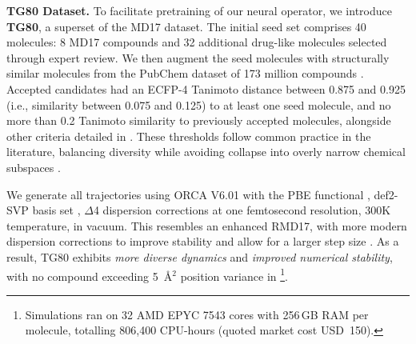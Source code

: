 \textbf{TG80 Dataset.}
To facilitate pretraining of our neural operator, we introduce \textbf{TG80}, a superset of the MD17 dataset. The initial seed set comprises 40 molecules: 8 MD17 compounds and 32 additional drug-like molecules selected through expert review. We then augment the seed molecules with structurally similar molecules from the PubChem dataset of 173 million compounds \cite{bolton_pubchem3d_2011}. 
%
Accepted candidates had an ECFP-4 Tanimoto distance between 0.875 and 0.925 (i.e., similarity between 0.075 and 0.125) to at least one seed molecule, and no more than 0.2 Tanimoto similarity to previously accepted molecules, alongside other criteria detailed in  \cite{greg_landrum_rdkitrdkit_2025, rogers_extended-connectivity_2010, rogers_computer_1960}. These thresholds follow common practice in the literature, balancing diversity while avoiding collapse into overly narrow chemical subspaces \cite{matter_selecting_1997, menke_natural_2021, eastman_spice_2023, harper_research_2004, zhang_activity_2023}.

We generate all trajectories using ORCA V6.01 \cite{neese_software_2022} with the PBE functional \cite{perdew_generalized_1996}, def2-SVP basis set \cite{weigend_balanced_2005}, \(\Delta\)4 dispersion corrections \cite{caldeweyher_generally_2019, caldeweyher_extension_2020, wittmann_extension_2024} at one femtosecond resolution, 300K temperature, in vacuum. This resembles an enhanced RMD17, with more modern dispersion corrections to improve stability and allow for a larger step size \cite{christensen_role_2020}. As a result, TG80 exhibits \textit{more diverse dynamics} and \textit{improved numerical stability}, with no compound exceeding 5~\AA{}\(^2\) position variance in \footnote{Simulations ran on 32 AMD EPYC 7543 cores with 256\,GB RAM per molecule, totalling 806{,}400 CPU-hours (quoted market cost USD~150).}.
\vspace{-0.3em}
